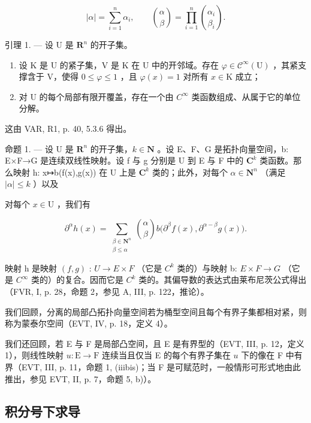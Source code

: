 \[
| \alpha | = \sum_ {i = 1} ^ {n} \alpha_ {i}, \qquad \binom{\alpha}{\beta} = \prod_ {i = 1} ^ {n} \binom{\alpha_ {i}}{\beta_ {i}}.
\]

引理 1. --- 设 U 是 \(\mathbf{R}^{n}\) 的开子集。

\begin{enumerate}
\def\labelenumi{\alph{enumi})}
\item
  设 K 是 U 的紧子集，V 是 K 在 U 中的开邻域。存在 \(\varphi \in \mathcal{C}^{\infty}(\mathrm{U})\) ，其紧支撑含于 V，使得 \(0 \leqslant \varphi \leqslant 1\) ，且 \(\varphi(x) = 1\) 对所有 \(x \in \mathrm{K}\) 成立；
\item
  对 U 的每个局部有限开覆盖，存在一个由 \(C^{\infty}\) 类函数组成、从属于它的单位分解。
\end{enumerate}

这由 VAR, R1, p. 40, 5.3.6 得出。

命题 1. --- 设 U 是 \(\mathbf{R}^{n}\) 的开子集，\(k\in\mathbf{N}\) 。设 E、F、G 是拓扑向量空间，b: E×F→G 是连续双线性映射。设 f 与 g 分别是 U 到 E 与 F 中的 \(\mathbf{C}^{k}\) 类函数。那么映射 h: x↦b(f(x),g(x)) 在 U 上是 \(\mathbf{C}^{k}\) 类的；此外，对每个 \(\alpha\in\mathbf{N}^{n}\) （满足 \(|\alpha|\leqslant k\) ）以及

对每个 \(x \in \mathrm{U}\) ，我们有

\[
\partial^{\alpha}h(x) = \sum_{\substack{\beta \in \mathbf{N}^{n}\\ \beta \leqslant \alpha}}\binom {\alpha}{\beta}b\big(\partial^{\beta}f(x),\partial^{\alpha -\beta}g(x)\big).
\]

映射 h 是映射 \((f,g)\) : \(U \rightarrow E \times F\) （它是 \(C^{k}\) 类的）与映射 b: \(E \times F \rightarrow G\) （它是 \(C^{\infty}\) 类的）的复合。因而它是 \(C^{k}\) 类的。其偏导数的表达式由莱布尼茨公式得出（FVR, I, p. 28，命题 2，参见 A, III, p. 122，推论）。

我们回顾，分离的局部凸拓扑向量空间若为桶型空间且每个有界子集都相对紧，则称为蒙泰尔空间（EVT, IV, p. 18，定义 4）。

我们还回顾，若 E 与 F 是局部凸空间，且 E 是有界型的（EVT, III, p. 12，定义 1），则线性映射 \(u\colon\mathrm{E}\to\mathrm{F}\) 连续当且仅当 E 的每个有界子集在 \(u\) 下的像在 F 中有界（EVT, III, p. 11，命题 1, (iiibis)；当 F 是可赋范时，一般情形可形式地由此推出，参见 EVT, II, p. 7，命题 5, b)）。

\subsection{积分号下求导}

